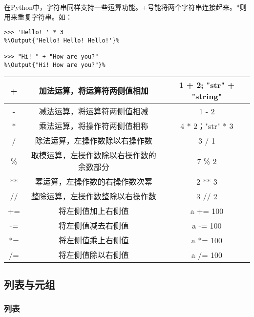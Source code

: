 在Python中，字符串同样支持一些运算功能。+号能将两个字符串连接起来。*则用来重复字符串。如：

\begin{lstlisting}
>>> 'Hello! ' * 3
%\Output{'Hello! Hello! Hello!'}%

>>> "Hi! " + "How are you?"
%\Output{"Hi! How are you?"}%

\end{lstlisting}

\begin{center}
    \tabletail{\hline}
    \tablelasttail{\hline}
    \begin{supertabular}{|c|c|c|}
        \hline
        + & 加法运算，将运算符两侧值相加 & 1 + 2; "str" + "string" \\
        \hline
        - & 减法运算，将运算符两侧值相减 & 1 - 2\\
        \hline
        * & 乘法运算，将操作符两侧值相称 & 4 * 2；"str" * 3\\
        \hline
        / & 除法运算，左操作数除以右操作数 & 3 / 1\\
        \hline
        \% & 取模运算，左操作数除以右操作数的余数部分 & 7 \% 2\\
        \hline
        ** & 幂运算，左操作数的右操作数次幂 & 2 ** 3\\
        \hline
        // & 整除运算，左操作数整除以右操作数& 3 // 2\\
        \hline
        += & 将左侧值加上右侧值 & a += 100\\
        \hline
        -= & 将左侧值减去右侧值 & a -= 100\\
        \hline
        *= & 将左侧值乘上右侧值 & a *= 100\\
        \hline
        /= & 将左侧值除以右侧值 & a /= 100\\
        \hline
    \end{supertabular}
    \label{table:3.1}
\end{center}


\subsection{列表与元组}

\subsubsection{列表}

